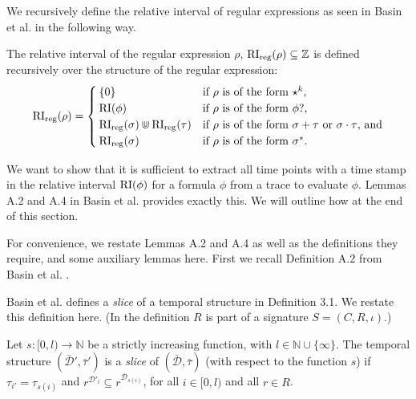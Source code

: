 We recursively define the relative interval of regular expressions as seen in Basin et al. \cite{Basin2020} in the following way.

\begin{definition}
    \label{def:rel-int-reg}
    The relative interval of the regular expression $\rho$, $\operatorname{RI}_{\text{reg}}(\rho) \subseteq \mathbb{Z}$ is defined recursively over the structure of the regular expression:
    \begin{equation*}
        \operatorname{RI}_{\text{reg}}(\rho) =
        \begin{cases}
            \{0\} & \text{if $\rho$ is of the form $\star^k$,} \\
            \operatorname{RI}(\phi) & \text{if $\rho$ is of the form $\phi?$,} \\
            \operatorname{RI}_{\text{reg}}(\sigma) \Cup \operatorname{RI}_{\text{reg}}(\tau) & \text{if $\rho$ is of the form $\sigma + \tau$ or $\sigma \cdot \tau$, and} \\
            \operatorname{RI}_{\text{reg}}(\sigma) & \text{if $\rho$ is of the form $\sigma^*$.}

        \end{cases}
    \end{equation*}
\end{definition}

We want to show that it is sufficient to extract all time points with a time stamp in the relative interval $\operatorname{RI}(\phi)$ for a formula $\phi$ from a trace to evaluate $\phi$.
Lemmas A.2 and A.4 in Basin et al. \cite{Basin2016} provides exactly this.
We will outline how at the end of this section.

For convenience, we restate Lemmas A.2 and A.4 as well as the definitions they require, and some auxiliary lemmas here.
First we recall Definition A.2 from Basin et al. \cite{Basin2016}.

Basin et al. \cite{Basin2016} defines a \textit{slice} of a temporal structure in Definition 3.1.
We restate this definition here.
(In the definition $R$ is part of a signature $S=(C,R,\iota)$.)
\begin{definition}
    \label{def:slice}
    Let $s : [0,l) \to \mathbb{N}$ be a strictly increasing function, with $l \in \mathbb{N} \cup \{\infty\}$.
    The temporal structure $(\bar{\mathcal{D}}', \bar{\tau}')$ is a \textit{slice} of $(\bar{\mathcal{D}}, \bar{\tau})$ (with respect to the function $s$) if $\tau_{i'} = \tau_{s(i)}$ and $r^{\mathcal{D}'_i} \subseteq r^{\mathcal{D}_{s(i)}}$, for all $i \in [0,l)$ and all $r \in R$.
\end{definition}

